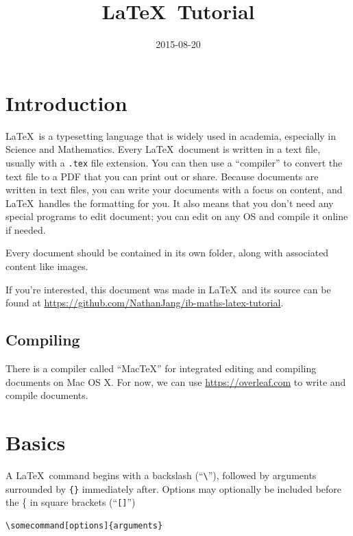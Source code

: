 \documentclass{chan}
\title{\LaTeX\ Tutorial}
\date{2015-08-20}
\subtitle{}
\begin{document}


\section{Introduction}

\LaTeX\ is a typesetting language that is widely used in academia, especially in Science and Mathematics.
Every \LaTeX\ document is written in a text file, usually with a \verb$.tex$ file extension.
You can then use a ``compiler'' to convert the text file to a PDF that you can print out or share.
Because documents are written in text files, you can write your documents with a focus on content, and \LaTeX\ handles the formatting for you.
It also means that you don't need any special programs to edit document; you can edit on any OS and compile it online if needed.

Every document should be contained in its own folder, along with associated content like images.

If you're interested, this document was made in \LaTeX\ and its source can be found at \url{https://github.com/NathanJang/ib-maths-latex-tutorial}.

\subsection{Compiling}

There is a compiler called ``MacTeX'' for integrated editing and compiling documents on Mac OS X.
For now, we can use \url{https://overleaf.com} to write and compile documents.

\section{Basics}

A \LaTeX\ command begins with a backslash (``\verb$\$''), followed by arguments surrounded by \verb${}$ immediately after.
Options may optionally be included before the \{ in square brackets (``\verb$[]$'')

\begin{lstlisting}
\somecommand[options]{arguments}
\end{lstlisting}
\end{document}

